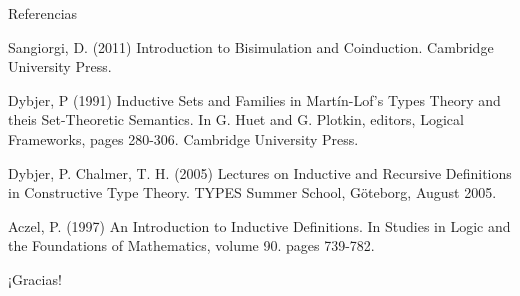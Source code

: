 \documentclass[dvipsnames, 8pt]{beamer} %
\theoremstyle{plain}
\theoremstyle{definition}
\begin{document}
\begin{frame}{Referencias}
    \begin{thebibliography}{9}
        Sangiorgi, D. (2011)
        Introduction to Bisimulation and Coinduction.
        Cambridge University Press.
        
        Dybjer, P (1991)
        Inductive Sets and Families in Martín-Lof's Types Theory and theis Set-Theoretic Semantics. In G. Huet and G. Plotkin, editors, Logical Frameworks, pages 280-306. Cambridge University Press.
        
        Dybjer, P. Chalmer, T. H. (2005)
        Lectures on Inductive and Recursive Definitions in Constructive Type Theory. TYPES Summer School, Göteborg, August 2005.
    
        Aczel, P. (1997)
        An Introduction to Inductive Definitions. In Studies in Logic and the Foundations of Mathematics, volume 90. pages 739-782.
    \end{thebibliography}
\end{frame}

\begin{frame}
    \begin{center}
        {\Huge\calligra ¡Gracias!}
    \end{center}
\end{frame}
\end{document}
